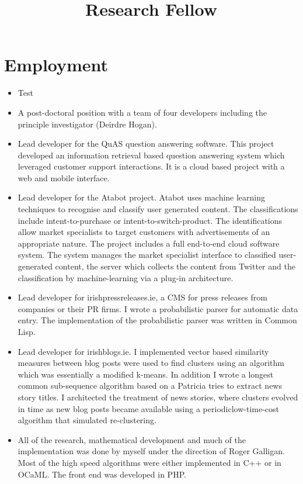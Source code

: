 \documentclass[a4paper,11pt]{moderncv}
\title{Research Fellow}
\begin{document}
\maketitle

\section{Employment}

{
  \begin{itemize}
  \item Test
  \end{itemize}
}

{
  \begin{itemize}
  \item A post-doctoral position with a team of four developers including the principle investigator (Deirdre Hogan).
  \item Lead developer for the QuAS question answering software. This project developed an information retrieval based question answering system which leveraged customer support interactions. It is a cloud based project with a web and mobile interface.
  \item Lead developer for the Atabot project. Atabot uses machine learning techniques to recognise and classify user generated content. The classifications include intent-to-purchase or intent-to-switch-product. The identifications allow market specialists to target customers with advertisements of an appropriate nature. The project includes a full end-to-end cloud software system. The system manages the market specialist interface to classified user-generated content, the server which collects the content from Twitter and the classification by machine-learning via a plug-in architecture.
  \end{itemize}
}

{
  \begin{itemize}
  \item Lead developer for irishpressreleases.ie, a CMS for press releases from companies or their PR firms. I wrote a probabilistic parser for automatic data entry. The implementation of the probabilistic parser was written in Common Lisp.
  \item Lead developer for irishblogs.ie. I implemented vector based similarity measures between blog posts were used to find clusters using an algorithm which was essentially a modified k-means. In addition I wrote a longest common sub-sequence algorithm based on a Patricia tries to extract news story titles. I architected the treatment of news stories, where clusters evolved in time as new blog posts became available using a periodiclow-time-cost algorithm that simulated re-clustering. 
  \item All of the research, mathematical development and much of the implementation was done by myself under the direction of Roger Galligan. Most of the high speed algorithms were either implemented in C++ or in OCaML. The front end was developed in PHP.
  \end{itemize}
}
\end{document}

